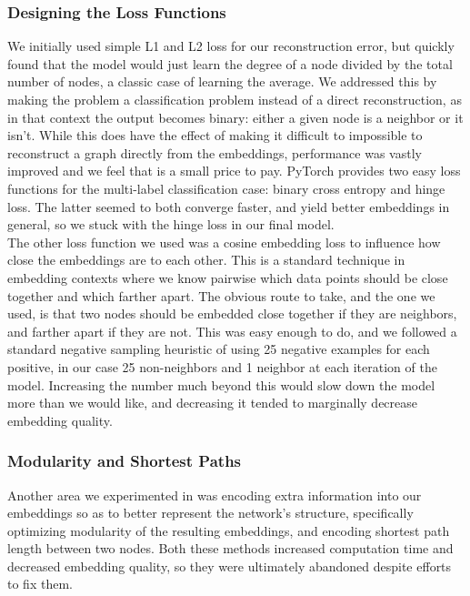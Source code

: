 \documentclass[12pt,twoside]{report}
\begin{document}
\subsubsection{Designing the Loss Functions}

We initially used simple L1 and L2 loss for our reconstruction error, but quickly found that the model would just learn the degree of a node divided by the total number of nodes, a classic case of learning the average. We addressed this by making the problem a classification problem instead of a direct reconstruction, as in that context the output becomes binary: either a given node is a neighbor or it isn't. While this does have the effect of making it difficult to impossible to reconstruct a graph directly from the embeddings, performance was vastly improved and we feel that is a small price to pay. PyTorch provides two easy loss functions for the multi-label classification case: binary cross entropy and hinge loss. The latter seemed to both converge faster, and yield better embeddings in general, so we stuck with the hinge loss in our final model. \\

The other loss function we used was a cosine embedding loss to influence how close the embeddings are to each other. This is a standard technique in embedding contexts where we know pairwise which data points should be close together and which farther apart. The obvious route to take, and the one we used, is that two nodes should be embedded close together if they are neighbors, and farther apart if they are not. This was easy enough to do, and we followed a standard negative sampling heuristic of using 25 negative examples for each positive, in our case 25 non-neighbors and 1 neighbor at each iteration of the model. Increasing the number much beyond this would slow down the model more than we would like, and decreasing it tended to marginally decrease embedding quality. \\

\subsubsection{Modularity and Shortest Paths}

Another area we experimented in was encoding extra information into our embeddings so as to better represent the network's structure, specifically optimizing modularity of the resulting embeddings, and encoding shortest path length between two nodes. Both these methods increased computation time and decreased embedding quality, so they were ultimately abandoned despite efforts to fix them. \\
\end{document}
